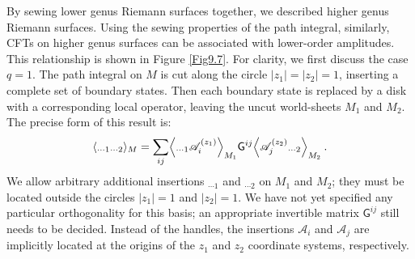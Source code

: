 By sewing lower genus Riemann surfaces together, we described higher genus Riemann surfaces. Using the sewing properties of the path integral, similarly, CFTs on higher genus surfaces can be associated with lower-order amplitudes. This relationship is shown in Figure \ref{Fig9.7}.
For clarity, we first discuss the case $q=1$. The path integral on $M$ is cut along the circle $|z_{1}|=|z_{2}|=1$, inserting a complete set of boundary states. Then each boundary state is replaced by a disk with a corresponding local operator, 
leaving the uncut world-sheets $M_{1}$ and $M_{2}$.
The precise form of this result is:
\begin{equation}
	\langle {}_{\cdots 1} {}_{\cdots 2}\rangle_{M} = \sum_{i j}\Bigl \langle {}_{\cdots 1} \mathscr{A}_{i}^{(z_{1})}\Bigr\rangle_{M_{1}} 
	\mathsf{G}^{ij} \Bigl\langle\mathscr{A}_{j}^{(z_{2})} {}_{\cdots 2}\Bigr\rangle_{M_{2}} \:.
	\label{9.4.1}
\end{equation}
We allow arbitrary additional insertions ${}_{\cdots 1}$ and ${}_{\cdots 2}$ on $M_{1}$ and $M_{2}$; they must be located outside the circles $|z_{1}|=1$ and $|z_{2}|=1$. 
We have not yet specified any particular orthogonality for this basis; an appropriate invertible matrix $\mathsf{G}^{i j}$ still needs to be decided.
Instead of the handles, the insertions $\mathscr{A}_{i}$ and $\mathscr{A}_{j}$ 
are implicitly located at the origins of the $z_{1}$ and $z_{2}$ coordinate systems, respectively.

